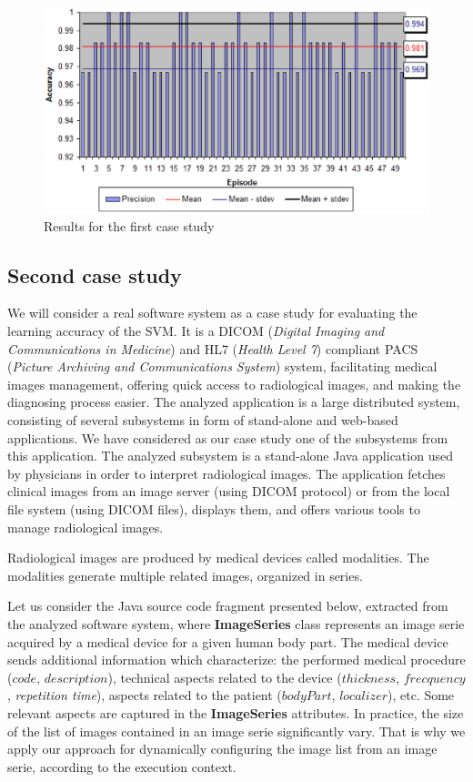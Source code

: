 \begin{figure}
   \centering
       \includegraphics[scale=0.28]{prec.eps}
              \caption{Results for the first case study}
 \label{sprec1}
\end{figure}

\subsection{Second case study}\label{cs}

We will consider a real software system as a case study for evaluating the learning accuracy of the SVM. It is a DICOM (\emph{Digital Imaging and Communications in Medicine}) \cite{dicom} and HL7 (\emph{Health Level 7}) \cite{hl7} compliant PACS (\emph{Picture Archiving and Communications System}) system, facilitating medical images management, offering  quick access to radiological images, and making the diagnosing process easier. The analyzed application is a large distributed system, consisting of several subsystems in form of stand-alone and web-based applications. We have considered as our case study one of the subsystems from this application.  The analyzed subsystem is a stand-alone Java application used by physicians in order to interpret radiological images. The application fetches clinical images from an image server (using DICOM protocol) or from the local file system (using DICOM files), displays them, and offers various tools to manage radiological images. 

Radiological images are produced by medical devices called modalities. The modalities generate multiple related images, organized in series. 

Let us consider the Java source code fragment presented below, extracted from the analyzed software system, where \textbf{ImageSeries} class represents an image serie acquired by a medical device for a given human body part. The medical device sends additional information which characterize: the performed medical procedure ($code$, $description$), technical aspects related to the device ($thickness$, $frecquency$, \emph{repetition time}), aspects related to the patient ($bodyPart$, $localizer$), etc. Some relevant aspects are captured in the \textbf{ImageSeries} attributes. In practice, the size of the list of images contained in an image serie significantly vary. That is why we apply our approach for dynamically configuring the image list from an image serie, according to the execution context.

